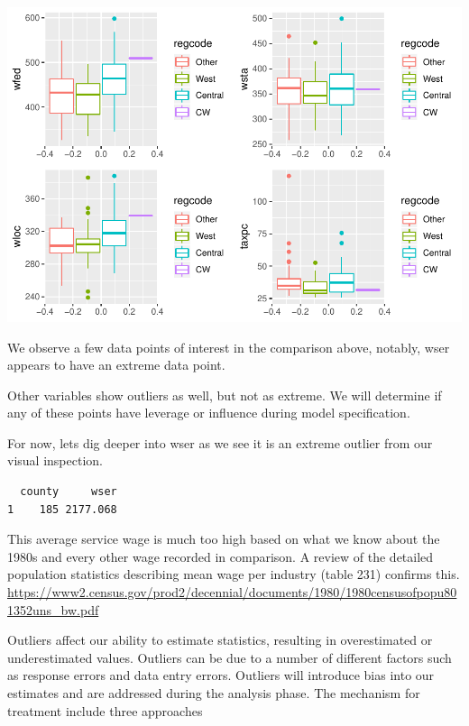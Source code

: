\documentclass[]{article}
\newenvironment{Shaded}{}{}
\newcommand{\DecValTok}[1]{#1}
\newcommand{\KeywordTok}[1]{\textcolor[rgb]{0.00,0.00,1.00}{#1}}
\newcommand{\NormalTok}[1]{#1}
\newcommand{\OperatorTok}[1]{#1}
\newcommand{\StringTok}[1]{\textcolor[rgb]{0.00,0.50,0.50}{#1}}
\begin{document}
\includegraphics{Bagnard_Gaustad_Hartman_Leung_Lab_3_files/figure-latex/unnamed-chunk-15-3.pdf}

We observe a few data points of interest in the comparison above,
notably, wser appears to have an extreme data point.

Other variables show outliers as well, but not as extreme. We will
determine if any of these points have leverage or influence during model
specification.

For now, lets dig deeper into wser as we see it is an extreme outlier
from our visual inspection.

\begin{Shaded}
\end{Shaded}

\begin{verbatim}
  county     wser
1    185 2177.068
\end{verbatim}

This average service wage is much too high based on what we know about
the 1980s and every other wage recorded in comparison. A review of the
detailed population statistics describing mean wage per industry (table
231) confirms this.
\url{https://www2.census.gov/prod2/decennial/documents/1980/1980censusofpopu801352uns_bw.pdf}

Outliers affect our ability to estimate statistics, resulting in
overestimated or underestimated values. Outliers can be due to a number
of different factors such as response errors and data entry errors.
Outliers will introduce bias into our estimates and are addressed during
the analysis phase. The mechanism for treatment include three approaches
\end{document}
